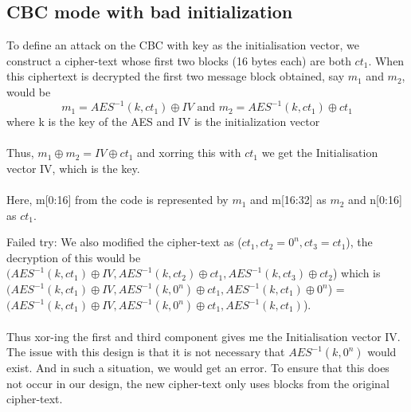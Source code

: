\documentclass{article}
\begin{document}
\subsection{CBC mode with bad initialization}
To define an attack on the CBC with key as the initialisation vector, we construct a cipher-text whose first two blocks (16 bytes each) are both $ct_1$. When this ciphertext is decrypted the first two message block obtained, say $m_1$ and $m_2$, would be
\[m_1=AES^{-1}(k,ct_1)\oplus IV\text{ and }
 m_2=AES^{-1}(k,ct_1)\oplus ct_1\]
where k is the key of the AES and IV is the initialization vector \\ \\
Thus, $m_1 \oplus m_2 = IV \oplus ct_1$ and xorring this with $ct_1$ we get the Initialisation vector IV, which is the key. \\ \\
Here, m[0:16] from the code is represented by $m_1$ and m[16:32] as $m_2$ and n[0:16] as $ct_1$. 
 
Failed try: We also modified the cipher-text as ($ct_1,ct_2 = 0^n,ct_3 = ct_1$), the decryption of this would be $(AES^{-1}(k,ct_1) \oplus IV, AES^{-1}(k,ct_2) \oplus ct_1, AES^{-1}(k,ct_3) \oplus ct_2$) which is $(AES^{-1}(k,ct_1) \oplus IV, AES^{-1}(k,0^n) \oplus ct_1, AES^{-1}(k,ct_1) \oplus 0^n$) = $(AES^{-1}(k,ct_1) \oplus IV, AES^{-1}(k,0^n) \oplus ct_1, AES^{-1}(k,ct_1)$).
\\
\\
Thus xor-ing the first and third component gives me the Initialisation vector IV. The issue with this design is that it is not necessary that $AES^{-1}(k,0^n)$ would exist. And in such a situation, we would get an error. To ensure that this does not occur in our design, the new cipher-text only uses blocks from the original cipher-text. 


\newpage
\section{}
\end{document}
